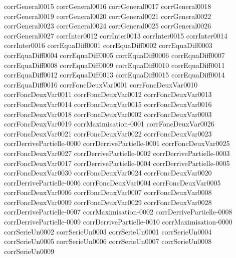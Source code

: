 {corrGeneral0015}
{corrGeneral0016}
{corrGeneral0017}
{corrGeneral0018}
{corrGeneral0019}
{corrGeneral0020}
{corrGeneral0021}
{corrGeneral0022}
{corrGeneral0023}
{corrGeneral0024}
{corrGeneral0025}
{corrGeneral0026}
{corrGeneral0027}
{corrInter0012}
{corrInter0013}
{corrInter0015}
{corrInter0014}
{corrInter0016}
{corrEquaDiff0001}
{corrEquaDiff0002}
{corrEquaDiff0003}
{corrEquaDiff0004}
{corrEquaDiff0005}
{corrEquaDiff0006}
{corrEquaDiff0007}
{corrEquaDiff0008}
{corrEquaDiff0009}
{corrEquaDiff0010}
{corrEquaDiff0011}
{corrEquaDiff0012}
{corrEquaDiff0013}
{corrEquaDiff0015}
{corrEquaDiff0014}
{corrEquaDiff0016}
{corrFoncDeuxVar0001}
{corrFoncDeuxVar0010}
{corrFoncDeuxVar0011}
{corrFoncDeuxVar0012}
{corrFoncDeuxVar0013}
{corrFoncDeuxVar0014}
{corrFoncDeuxVar0015}
{corrFoncDeuxVar0016}
{corrFoncDeuxVar0018}
{corrFoncDeuxVar0002}
{corrFoncDeuxVar0003}
{corrFoncDeuxVar0019}
{corrMaximisation-0001}
{corrFoncDeuxVar0026}
{corrFoncDeuxVar0021}
{corrFoncDeuxVar0022}
{corrFoncDeuxVar0023}
{corrDerrivePartielle-0000}
{corrDerrivePartielle-0001}
{corrFoncDeuxVar0025}
{corrFoncDeuxVar0027}
{corrDerrivePartielle-0002}
{corrDerrivePartielle-0003}
{corrFoncDeuxVar0017}
{corrDerrivePartielle-0004}
{corrDerrivePartielle-0005}
{corrFoncDeuxVar0030}
{corrFoncDeuxVar0024}
{corrFoncDeuxVar0020}
{corrDerrivePartielle-0006}
{corrFoncDeuxVar0004}
{corrFoncDeuxVar0005}
{corrFoncDeuxVar0006}
{corrFoncDeuxVar0007}
{corrFoncDeuxVar0008}
{corrFoncDeuxVar0009}
{corrFoncDeuxVar0029}
{corrFoncDeuxVar0028}
{corrDerrivePartielle-0007}
{corrMaximisation-0002}
{corrDerrivePartielle-0008}
{corrDerrivePartielle-0009}
{corrDerrivePartielle-0010}
{corrMaximisation-0000}
{corrSerieUn0002}
{corrSerieUn0003}
{corrSerieUn0001}
{corrSerieUn0004}
{corrSerieUn0005}
{corrSerieUn0006}
{corrSerieUn0007}
{corrSerieUn0008}
{corrSerieUn0009}
